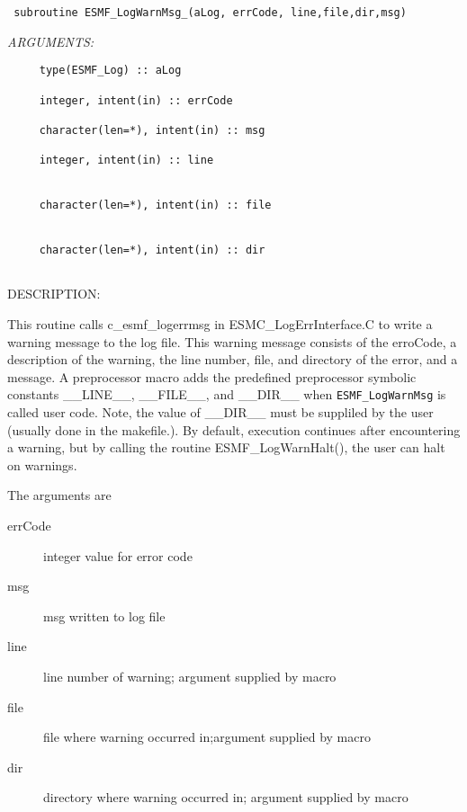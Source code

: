   
\begin{verbatim} subroutine ESMF_LogWarnMsg_(aLog, errCode, line,file,dir,msg)
 \end{verbatim}{\em ARGUMENTS:}
\begin{verbatim}     type(ESMF_Log) :: aLog
 
     integer, intent(in) :: errCode               
 
     character(len=*), intent(in) :: msg 
 
     integer, intent(in) :: line        
                                      
 
     character(len=*), intent(in) :: file  
                                          
 
     character(len=*), intent(in) :: dir   
                                         
 \end{verbatim}
{\sf DESCRIPTION:\\ }


      This routine calls c\_esmf\_logerrmsg in ESMC\_LogErrInterface.C
      to write a warning message to the log file.  This warning
      message consists of the erroCode, a description of the warning, the 
      line number, file, and directory of the error, and a message. A 
      preprocessor macro adds the predefined preprocessor symbolic
      constants \_\_LINE\_\_, \_\_FILE\_\_, and \_\_DIR\_\_ when
      {\tt ESMF\_LogWarnMsg} is called user code.  Note,
      the value of \_\_DIR\_\_ 
      must be suppliled by the user (usually done in
      the makefile.).  By default, execution continues after encountering
      a warning, but by calling the routine ESMF\_LogWarnHalt(), the user
      can halt on warnings.
  
      The arguments are
      \begin{description}
     
      \item[errCode]
      integer value for error code
  
      \item[msg]
      msg written to log file
  
      \item[line]
      line number of warning; argument supplied by macro
  
      \item[file]
      file where warning occurred in;argument supplied by macro
  
      \item[dir]
      directory where warning occurred in; argument supplied by macro
    
      \end{description}
   
